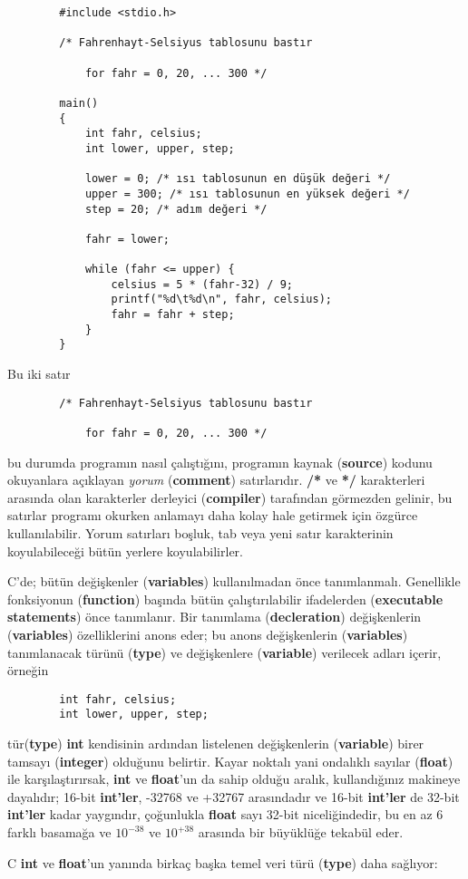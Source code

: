 \documentclass[a4paper,12pt,oneside]{book}
\begin{document}
\begin{lstlisting}
		#include <stdio.h>

		/* Fahrenhayt-Selsiyus tablosunu bastır

			for fahr = 0, 20, ... 300 */

		main()
		{
			int fahr, celsius;
			int lower, upper, step;

			lower = 0; /* ısı tablosunun en düşük değeri */
			upper = 300; /* ısı tablosunun en yüksek değeri */
			step = 20; /* adım değeri */

			fahr = lower;

			while (fahr <= upper) {
				celsius = 5 * (fahr-32) / 9;
				printf("%d\t%d\n", fahr, celsius);
				fahr = fahr + step;
			}
		}
\end{lstlisting}
Bu iki satır \begin{lstlisting}
		/* Fahrenhayt-Selsiyus tablosunu bastır

			for fahr = 0, 20, ... 300 */
\end{lstlisting}
bu durumda programın nasıl çalıştığını, programın kaynak (\textbf{source}) kodunu okuyanlara açıklayan \textit{yorum} (\textbf{comment}) satırlarıdır. \textbf{/*} ve \textbf{*/} karakterleri arasında olan karakterler derleyici (\textbf{compiler}) tarafından görmezden gelinir, bu satırlar programı okurken anlamayı daha kolay hale getirmek için özgürce kullanılabilir. Yorum satırları boşluk, tab veya yeni satır karakterinin koyulabileceği bütün yerlere koyulabilirler.
\par C'de; bütün değişkenler (\textbf{variables}) kullanılmadan önce tanımlanmalı. Genellikle fonksiyonun (\textbf{function}) başında bütün çalıştırılabilir ifadelerden (\textbf{executable statements}) önce tanımlanır. Bir tanımlama (\textbf{decleration}) değişkenlerin (\textbf{variables}) özelliklerini anons eder; bu anons değişkenlerin (\textbf{variables}) tanımlanacak türünü (\textbf{type}) ve değişkenlere (\textbf{variable}) verilecek adları içerir, örneğin
\newline
\begin{lstlisting}
		int fahr, celsius;
		int lower, upper, step;
\end{lstlisting}
tür(\textbf{type}) \textbf{int} kendisinin ardından listelenen değişkenlerin (\textbf{variable}) birer tamsayı (\textbf{integer}) olduğunu belirtir. Kayar noktalı yani ondalıklı sayılar (\textbf{float}) ile karşılaştırırsak, \textbf{int} ve \textbf{float}'un da sahip olduğu aralık, kullandığınız makineye dayalıdır; 16-bit \textbf{int'ler}, -32768 ve +32767 arasındadır ve 16-bit \textbf{int'ler} de 32-bit \textbf{int'ler} kadar yaygındır, çoğunlukla \textbf{float} sayı 32-bit niceliğindedir, bu en az 6 farklı basamağa ve $10^{-38}$ ve $10^{+38}$ arasında bir büyüklüğe tekabül eder.
\par C \textbf{int} ve \textbf{float}'un yanında birkaç başka temel veri türü (\textbf{type}) daha sağlıyor:
\end{document}
